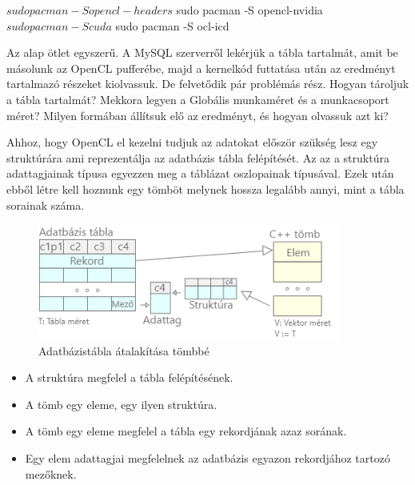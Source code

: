 \begin{python}
$ sudo pacman -S opencl-headers
$ sudo pacman -S opencl-nvidia
$ sudo pacman -S cuda
$ sudo pacman -S ocl-icd
\end{python}


Az alap ötlet egyszerű. A MySQL szerverről lekérjük a tábla tartalmát, amit be másolunk az OpenCL pufferébe, majd a kernelkód futtatása után az eredményt tartalmazó részeket kiolvassuk. De felvetődik pár problémás rész. Hogyan tároljuk a tábla tartalmát? Mekkora legyen a Globális munkaméret és a munkacsoport méret? Milyen formában állítsuk elő az eredményt, és hogyan olvassuk azt ki?

Ahhoz, hogy OpenCL el kezelni tudjuk az adatokat először szükség lesz egy struktúrára ami reprezentálja az adatbázis tábla felépítését. Az az a struktúra adattagjainak típusa egyezzen meg a táblázat oszlopainak típusával. Ezek után ebből létre kell hoznunk egy tömböt melynek hossza legalább annyi, mint a tábla sorainak száma.

\begin{figure}[h!]
\centering
\includegraphics[width=10cm]{images/table-struct.png}
\caption{Adatbázistábla átalakítása tömbbé}
\label{fig:opencl}
\end{figure}

\begin{itemize}
\item A struktúra megfelel a tábla felépítésének.
\item A tömb egy eleme, egy ilyen struktúra.
\item A tömb egy eleme megfelel a tábla egy rekordjának azaz sorának.
\item Egy elem adattagjai megfelelnek az adatbázis egyazon rekordjához tartozó mezőknek.
\end{itemize}

\newpage
{}

